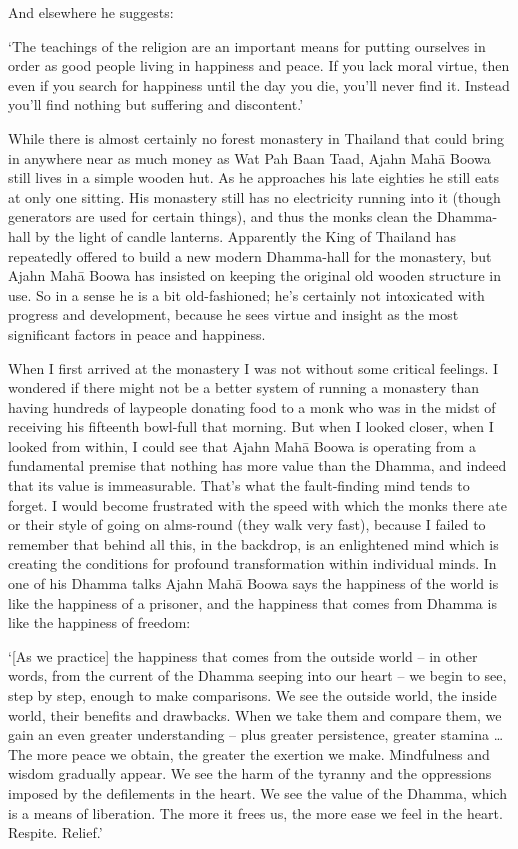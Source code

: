 And elsewhere he suggests:

`The teachings of the religion are an important means for putting
ourselves in order as good people living in happiness and peace. If you
lack moral virtue, then even if you search for happiness until the day
you die, you'll never find it. Instead you'll find nothing but suffering
and discontent.'

While there is almost certainly no forest monastery in Thailand that
could bring in anywhere near as much money as Wat Pah Baan Taad, Ajahn
Mahā Boowa still lives in a simple wooden hut. As he approaches his late
eighties he still eats at only one sitting. His monastery still has no
electricity running into it (though generators are used for certain
things), and thus the monks clean the Dhamma-hall by the light of candle
lanterns. Apparently the King of Thailand has repeatedly offered to
build a new modern Dhamma-hall for the monastery, but Ajahn Mahā Boowa
has insisted on keeping the original old wooden structure in use. So in
a sense he is a bit old-fashioned; he's certainly not intoxicated with
progress and development, because he sees virtue and insight as the most
significant factors in peace and happiness. 

When I first arrived at the monastery I was not without some critical
feelings. I wondered if there might not be a better system of running a
monastery than having hundreds of laypeople donating food to a monk who
was in the midst of receiving his fifteenth bowl-full that morning. But
when I looked closer, when I looked from within, I could see that Ajahn
Mahā Boowa is operating from a fundamental premise that nothing has more
value than the Dhamma, and indeed that its value is immeasurable. That's
what the fault-finding mind tends to forget. I would become frustrated
with the speed with which the monks there ate or their style of going on
alms-round (they walk very fast), because I failed to remember that
behind all this, in the backdrop, is an enlightened mind which is
creating the conditions for profound transformation within individual
minds. In one of his Dhamma talks Ajahn Mahā Boowa says the happiness of
the world is like the happiness of a prisoner, and the happiness that
comes from Dhamma is like the happiness of freedom: 

`[As we practice] the happiness that comes from the outside world
-- in other words, from the current of the Dhamma seeping into our
heart -- we begin to see, step by step, enough to make comparisons. We
see the outside world, the inside world, their benefits and drawbacks. 
When we take them and compare them, we gain an even greater
understanding -- plus greater persistence, greater stamina \ldots{} The
more peace we obtain, the greater the exertion we make. Mindfulness and
wisdom gradually appear. We see the harm of the tyranny and the
oppressions imposed by the defilements in the heart. We see the value of
the Dhamma, which is a means of liberation. The more it frees us, the
more ease we feel in the heart. Respite. Relief.'

